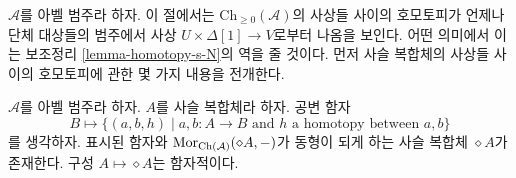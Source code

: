 \noindent
$\mathcal{A}$를 아벨 범주라 하자. 이 절에서는
$\text{Ch}_{\geq 0}(\mathcal{A})$의 사상들 사이의 호모토피가 언제나
단체 대상들의 범주에서 사상 $U \times \Delta[1] \to V$로부터 나옴을
보인다. 어떤 의미에서 이는 보조정리 \ref{lemma-homotopy-s-N}의 역을
줄 것이다. 먼저 사슬 복합체의 사상들 사이의 호모토피에 관한 몇 가지
내용을 전개한다.

\begin{lemma}
\label{lemma-represent-homotopy}
$\mathcal{A}$를 아벨 범주라 하자. $A$를 사슬 복합체라 하자. 공변 함자
$$
B \longmapsto
\{
(a, b, h)
\mid
a, b : A \to B\text{ and }h\text{ a homotopy between }a, b
\}
$$
를 생각하자. 표시된 함자와
$\mathop{\mathrm{Mor}}\nolimits_{\text{Ch}(\mathcal{A})}(\diamond A, -)$가 동형이 되게 하는
사슬 복합체 $\diamond A$가 존재한다. 구성 $A \mapsto \diamond A$는
함자적이다.
\end{lemma}

